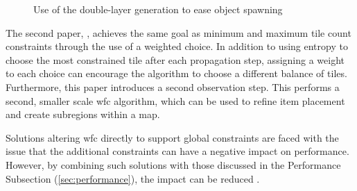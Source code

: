 \begin{figure}[H]
    \centering
    \hfill
    \caption{Use of the double-layer generation to ease object spawning \cite{WFC_Automatic_Rules_And_Better_Symmetries}}
    \label{fig:wfcMultiLayer}
\end{figure}

The second paper, \cite{WFC_Design_Constraints}, achieves the same goal as minimum and maximum tile count constraints through the use of a weighted choice. In addition to using entropy to choose the most constrained tile after each propagation step, assigning a weight to each choice can encourage the algorithm to choose a different balance of tiles. Furthermore, this paper introduces a second observation step. This performs a second, smaller scale \acrshort{wfc} algorithm, which can be used to refine item placement and create subregions within a map.

Solutions altering \acrshort{wfc} directly to support global constraints are faced with the issue that the additional constraints can have a negative impact on performance. However, by combining such solutions with those discussed in the Performance Subsection (\ref{sec:performance}), the impact can be reduced \cite{WFC_ConstraintSolving_and_ML}.


